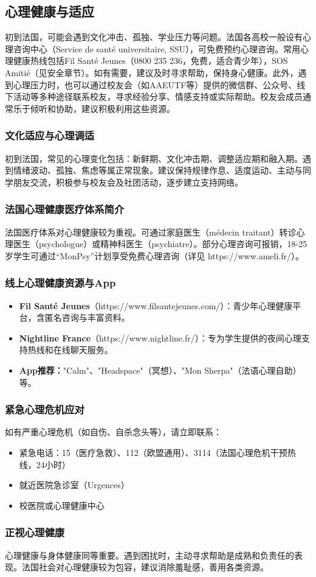 \subsection{心理健康与适应}

初到法国，可能会遇到文化冲击、孤独、学业压力等问题。法国各高校一般设有心理咨询中心（Service de santé universitaire, SSU），可免费预约心理咨询。常用心理健康热线包括Fil Santé Jeunes（0800 235 236，免费，适合青少年），SOS Amitié（见安全章节）。如有需要，建议及时寻求帮助，保持身心健康。此外，遇到心理压力时，也可以通过校友会（如AAEUTF等）提供的微信群、公众号、线下活动等多种途径联系校友，寻求经验分享、情感支持或实际帮助。校友会成员通常乐于倾听和协助，建议积极利用这些资源。

\subsubsection{文化适应与心理调适}
初到法国，常见的心理变化包括：新鲜期、文化冲击期、调整适应期和融入期。遇到情绪波动、孤独、焦虑等属正常现象。建议保持规律作息、适度运动、主动与同学朋友交流，积极参与校友会及社团活动，逐步建立支持网络。

\subsubsection{法国心理健康医疗体系简介}
法国医疗体系对心理健康较为重视。可通过家庭医生（médecin traitant）转诊心理医生（psychologue）或精神科医生（psychiatre）。部分心理咨询可报销，18-25岁学生可通过“MonPsy”计划享受免费心理咨询（详见 https://www.ameli.fr/）。

\subsubsection{线上心理健康资源与App}
\begin{itemize}
    \item \textbf{Fil Santé Jeunes}（https://www.filsantejeunes.com/）：青少年心理健康平台，含匿名咨询与丰富资料。
    \item \textbf{Nightline France}（https://www.nightline.fr/）：专为学生提供的夜间心理支持热线和在线聊天服务。
    \item \textbf{App推荐：}"Calm"、"Headspace"（冥想）、"Mon Sherpa"（法语心理自助）等。
\end{itemize}

\subsubsection{紧急心理危机应对}
如有严重心理危机（如自伤、自杀念头等），请立即联系：
\begin{itemize}
    \item 紧急电话：15（医疗急救）、112（欧盟通用）、3114（法国心理危机干预热线，24小时）
    \item 就近医院急诊室（Urgences）
    \item 校医院或心理健康中心
\end{itemize}

\subsubsection{正视心理健康}
心理健康与身体健康同等重要。遇到困扰时，主动寻求帮助是成熟和负责任的表现。法国社会对心理健康较为包容，建议消除羞耻感，善用各类资源。
